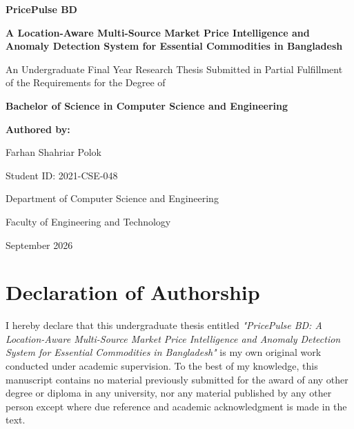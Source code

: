 \documentclass[12pt,a4paper,oneside]{report}
\begin{document}
\begin{titlepage}
    \centering
    \vspace*{1.5cm}
    
    {\Huge \bfseries PricePulse BD \par}
    \vspace{0.4cm}
    {\LARGE \bfseries A Location-Aware Multi-Source Market Price Intelligence and Anomaly Detection System for Essential Commodities in Bangladesh \par}
    
    \vspace{2.0cm}
    {\large An Undergraduate Final Year Research Thesis Submitted in Partial Fulfillment of the Requirements for the Degree of \par}
    \vspace{0.4cm}
    {\Large \bfseries Bachelor of Science in Computer Science and Engineering \par}
    
    \vspace{2.5cm}
    {\large \textbf{Authored by:} \par}
    \vspace{0.2cm}
    {\Large Farhan Shahriar Polok \par}
    {\large Student ID: 2021-CSE-048 \par}
    
    \vspace{2.0cm}
    {\large Department of Computer Science and Engineering \par}
    \vspace{0.2cm}
    {\large Faculty of Engineering and Technology \par}
    \vspace{0.5cm}
    {\large September 2026 \par}
\end{titlepage}

\setcounter{page}{2}

\chapter*{Declaration of Authorship}
I hereby declare that this undergraduate thesis entitled \textit{"PricePulse BD: A Location-Aware Multi-Source Market Price Intelligence and Anomaly Detection System for Essential Commodities in Bangladesh"} is my own original work conducted under academic supervision. To the best of my knowledge, this manuscript contains no material previously submitted for the award of any other degree or diploma in any university, nor any material published by any other person except where due reference and academic acknowledgment is made in the text.
\end{document}
